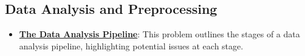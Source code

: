 \documentclass{article}%
\begin{document}
%
\subsection{Data Analysis and Preprocessing}%
\label{subsec:DataAnalysisandPreprocessing}%
\begin{itemize}[leftmargin=*]%
\item \href{https://purdue.brightspace.com/d2l/common/assets/pdfjs-d2l-dist/1.0.14-legacy/web/viewer.html?file=\%2Fcontent\%2Fenforced\%2F1095467-wl.202510.CS.24300.001\%2F10L1-CrossValidation.pdf\%3Fou\%3D1095467\&lang=en-us\&container=d2l-fileviewer-rendered-pdf\&fullscreen=d2l-fileviewer-rendered-pdf-dialog\&height=667#page=26}{\textbf{The Data Analysis Pipeline}}: This problem outlines the stages of a data analysis pipeline, highlighting potential issues at each stage.%
\end{itemize}

%
\end{document}
